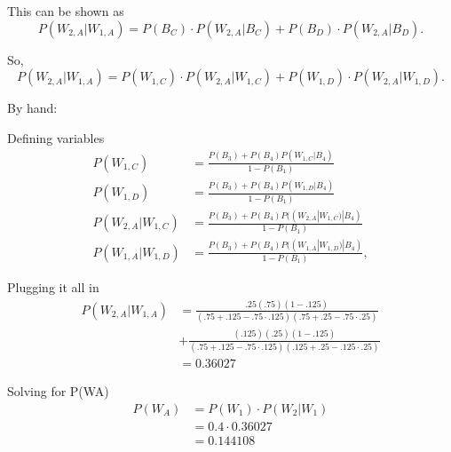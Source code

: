 \documentclass[11pt]{article}
\begin{document}
This can be shown as
\begin{equation*}
    P(W_{2,A} | W_{1,A}) = P(B_C) \cdot P(W_{2,A} | B_C) + P(B_D) \cdot P(W_{2,A} | B_D).
\end{equation*}

So,
\begin{equation*}
    P(W_{2,A} | W_{1,A}) = P(W_{1,C}) \cdot P(W_{2,A} | W_{1,C}) + P(W_{1,D}) \cdot P(W_{2,A} | W_{1,D}).
\end{equation*}

By hand:

Defining variables
\begin{align*}
    P(W_{1,C}) &= \frac{P(B_3)+ P(B_4)P(W_{1,C} | B_4)}{1 - P(B_1)}\\
    P(W_{1,D}) &= \frac{P(B_3) + P(B_4)P(W_{1,D} | B_4)}{1 - P(B_1)}\\
    P(W_{2,A} | W_{1,C}) &= \frac{P(B_3) + P(B_4)P((W_{2,A} | W_{1,C}) | B_4)}{1 - P(B_1)}\\
    P(W_{1,A} | W_{1,D}) &= \frac{P(B_3) + P(B_4)P((W_{1,A} | W_{1,D}) | B_4)}{1 - P(B_1)},
\end{align*}

Plugging it all in
\begin{align*}
    P(W_{2,A} | W_{1,A}) &=\frac{.25\left(.75\right)\left(1-.125\right)}{\left(.75+.125-.75\cdot.125\right)\left(.75+.25-.75\cdot .25\right)}\\
    &+\frac{(.125) (.25)\left(1-.125\right)}{\left(.75+.125-.75\cdot.125\right)\left(.125+.25-.125\cdot .25\right)}\\
    &= 0.36027
\end{align*}

Solving for P(WA)
\begin{align*}
    P(W_A) &= P(W_1) \cdot P(W_2 | W_1)\\
    &= 0.4 \cdot 0.36027\\
    &= 0.144108
\end{align*}
\end{document}
